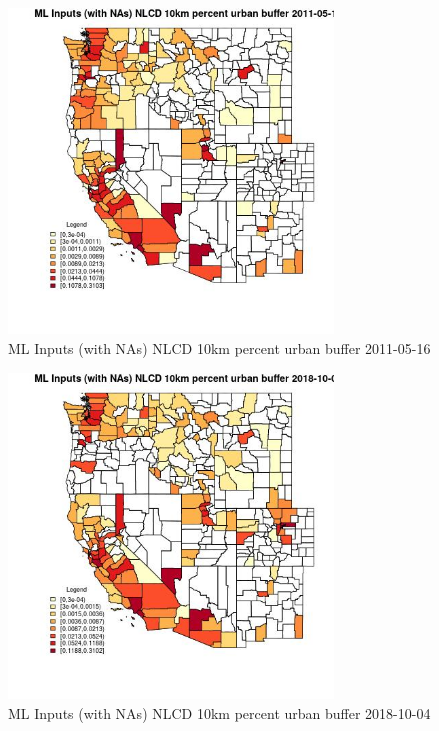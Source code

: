 \begin{figure} 
\centering  
\includegraphics[width=0.77\textwidth]{Code_Outputs/Report_ML_input_PM25_Step4_part_f_de_duplicated_aves_prioritize_24hr_obswNAs_CountyNLCD_10km_percent_urban_bufferMean2011-05-16.jpg} 
\caption{\label{fig:Report_ML_input_PM25_Step4_part_f_de_duplicated_aves_prioritize_24hr_obswNAsCountyNLCD_10km_percent_urban_bufferMean2011-05-16}ML Inputs (with NAs) NLCD 10km percent urban buffer 2011-05-16} 
\end{figure} 
 

\begin{figure} 
\centering  
\includegraphics[width=0.77\textwidth]{Code_Outputs/Report_ML_input_PM25_Step4_part_f_de_duplicated_aves_prioritize_24hr_obswNAs_CountyNLCD_10km_percent_urban_bufferMean2018-10-04.jpg} 
\caption{\label{fig:Report_ML_input_PM25_Step4_part_f_de_duplicated_aves_prioritize_24hr_obswNAsCountyNLCD_10km_percent_urban_bufferMean2018-10-04}ML Inputs (with NAs) NLCD 10km percent urban buffer 2018-10-04} 
\end{figure} 
 

